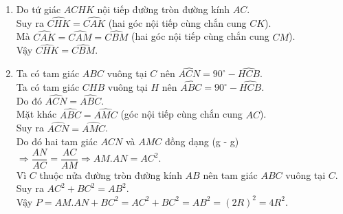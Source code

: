 \begin{ex}
{\begin{enumerate}
   Suy ra tứ giác $ACKH$ nội tiếp đường tròn đường kính $AC$.
   \item Do tứ giác $ACHK$ nội tiếp đường tròn đường kính $AC$.\\
   Suy ra $\widehat{CHK} = \widehat{CAK}$ (hai góc nội tiếp cùng chắn cung $CK$).\\
   Mà $\widehat{CAK} = \widehat{CAM} = \widehat{CBM}$ (hai góc nội tiếp cùng chắn cung $CM$).\\
   Vậy $\widehat{CHK} = \widehat{CBM}$.
   \item Ta có tam giác $ABC$ vuông tại $C$ nên $\widehat{ACN} = 90^\circ - \widehat{HCB}$.\\
   Ta có tam giác $CHB$ vuông tại $H$ nên $\widehat{ABC} = 90^\circ - \widehat{HCB}$.\\
   Do đó $\widehat{ACN} = \widehat{ABC}$.\\
   Mặt khác $\widehat{ABC} = \widehat{AMC}$ (góc nội tiếp cùng chắn cung $AC$).\\
   Suy ra $\widehat{ACN} = \widehat{AMC}$.\\
   Do đó hai tam giác $ACN$ và $AMC$ đồng dạng (g - g) $\Rightarrow \dfrac{AN}{AC} = \dfrac{AC}{AM} \Rightarrow AM.AN = AC^2$.\\
   Vì $C$ thuộc nửa đường tròn đường kính $AB$ nên tam giác $ABC$ vuông tại $C$.\\
   Suy ra $AC^2 + BC^2 = AB^2$.\\
   Vậy $P = AM.AN + BC^2 = AC^2 + BC^2 = AB^2 = (2R)^2 = 4R^2$.
   \end{enumerate}
    }
\end{ex}

